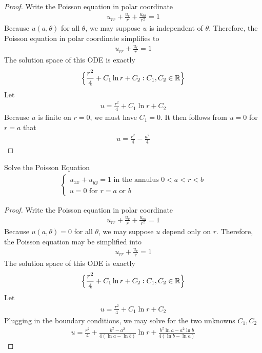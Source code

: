 \documentclass{report}
\begin{document}
\begin{proof}
Write the Poisson equation in polar coordinate 
\begin{align*}
u_{rr}+ \frac{u_r}{r} + \frac{u_{\theta \theta}}{r^2}=1
\end{align*}
Because $u(a, \theta)$ for all $\theta$, we may suppose $u$ is independent of  $\theta$. Therefore, the Poisson equation in polar coordinate simplifies to 
\begin{align*}
u_{rr} + \frac{u_r}{r} = 1
\end{align*}
The solution space of this ODE is exactly  
\begin{align*}
\Big\{  \frac{r^2}{4}+ C_1 \ln r+ C_2 : C_1, C_2 \in\mathbb{R} \Big\}
\end{align*}
Let 
\begin{align*}
u= \frac{r^2}{4}+ C_1 \ln r + C_2
\end{align*}
Because $u$ is finite on $r=0$, we must have  $C_1=0$. It then follows from  $u=0$ for  $r=a$ that   
\begin{align*}
u= \frac{r^2}{4}- \frac{a^2}{4}
\end{align*}
\end{proof}
\begin{question}{}{}
Solve the Poisson Equation 
\begin{align*}
\begin{cases}
  u_{xx}+u_{yy}=1\text{ in the annulus }0<a<r<b  \\
  u=0\text{ for }r=a\text{ or }b
\end{cases}
\end{align*}
\end{question}
\begin{proof}
Write the Poisson equation in polar coordinate 
\begin{align*}
  u_{rr}+ \frac{u_r}{r}+ \frac{u_{\theta \theta}}{r^2}=1
\end{align*}
Because $u(a,\theta)=0$ for all $\theta$, we may suppose $u$ depend only on  $r$. Therefore, the Poisson equation may be simplified into 
\begin{align*}
u_{rr} + \frac{u_r}{r}=1
\end{align*}
The solution space of this ODE is exactly 
\begin{align*}
\Big\{  \frac{r^2}{4}+ C_1 \ln r+ C_2 : C_1, C_2 \in\mathbb{R} \Big\}
\end{align*}
Let 
\begin{align*}
u= \frac{r^2}{4}+ C_1 \ln r + C_2
\end{align*}
Plugging in the boundary conditions, we may solve for the two unknowns $C_1,C_2$ 
 \begin{align*}
u= \frac{r^2}{4}+ \frac{b^2-a^2}{4(\ln a- \ln b)} \ln r + \frac{b^2 \ln a - a^2 \ln b}{4(\ln b- \ln a)}
\end{align*}
\end{proof}
\end{document}

